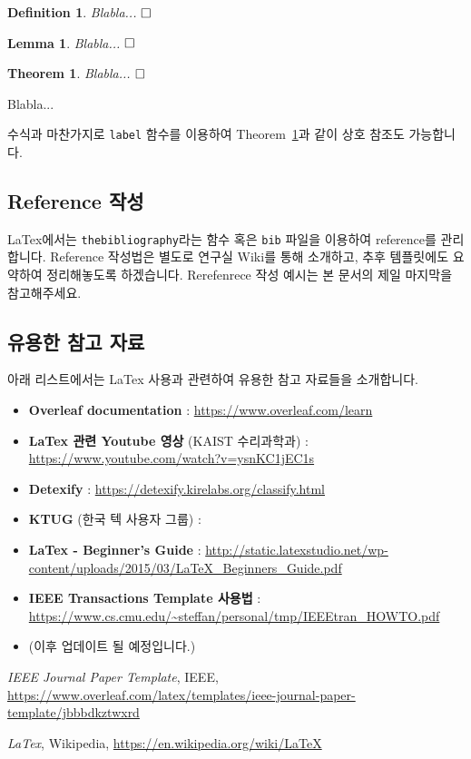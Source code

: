 \documentclass[journal]{IEEEtran}
\newtheorem{theorem}{Theorem}    %
\newtheorem{definition}{Definition} %
\newtheorem{lemma}{Lemma}    %
\begin{document}
\begin{definition}
    Blabla... $\hfill\square$
\end{definition}

\begin{lemma}
    Blabla... $\hfill\square$
\end{lemma}

\begin{theorem}\label{thm:Dummy}
Blabla... $\hfill\square$
\end{theorem}
\begin{IEEEproof}
    Blabla...
\end{IEEEproof}

수식과 마찬가지로 {\tt label} 함수를 이용하여 Theorem~\ref{thm:Dummy}과 같이 상호 참조도 가능합니다.

\subsection{Reference 작성}

LaTex에서는 {\tt thebibliography}라는 함수 혹은 {\tt bib} 파일을 이용하여 reference를 관리합니다. 
Reference 작성법은 별도로 연구실 Wiki를 통해 소개하고, 추후 템플릿에도 요약하여 정리해놓도록 하겠습니다. 
Rerefenrece 작성 예시는 본 문서의 제일 마지막을 참고해주세요. 

\subsection{유용한 참고 자료}

아래 리스트에서는 LaTex 사용과 관련하여 유용한 참고 자료들을 소개합니다. 
\begin{itemize}
\item {\bf Overleaf documentation} : \url{https://www.overleaf.com/learn}
\item {\bf LaTex 관련 Youtube 영상} (KAIST 수리과학과) : {\url{https://www.youtube.com/watch?v=ysnKC1jEC1s}}
\item {\bf Detexify} : \url{https://detexify.kirelabs.org/classify.html}
\item {\bf KTUG} (한국 텍 사용자 그룹) : 
\item {\bf LaTex - Beginner's Guide} : {\url{http://static.latexstudio.net/wp-content/uploads/2015/03/LaTeX_Beginners_Guide.pdf}}
\item {\bf IEEE Transactions Template 사용법 }: \url{https://www.cs.cmu.edu/~steffan/personal/tmp/IEEEtran_HOWTO.pdf}
\item (이후 업데이트 될 예정입니다.)
\end{itemize}



\appendices

\begin{thebibliography}{1}

\emph{IEEE Journal Paper Template}, IEEE, \url{https://www.overleaf.com/latex/templates/ieee-journal-paper-template/jbbbdkztwxrd}

\emph{LaTex}, Wikipedia, \url{https://en.wikipedia.org/wiki/LaTeX}

\end{thebibliography}
\end{document}
